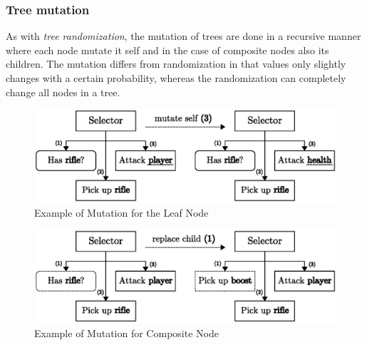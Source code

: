 \documentclass[a4paper, twocolumn]{article}
\begin{document}
        \subsubsection*{Tree mutation}

        As with \textit{tree randomization}, the mutation of trees are done in a recursive manner where each node mutate it self and in the case of composite nodes also its children. The mutation differs from randomization in that values only slightly changes with a certain probability, whereas the randomization can completely change all nodes in a tree.
       
        \begin{figure}[H]
            \centering
            \includegraphics[width=\linewidth]{share/leaf_mutation.eps}
            \caption{Example of Mutation for the Leaf Node}
            \label{fig:leaf_mutation}
        \end{figure}

        \begin{figure}[H]
            \centering
            \includegraphics[width=\linewidth]{share/child_replacement.eps}
            \caption{Example of Mutation for Composite Node}
            \label{fig:child_replacement}
        \end{figure}
\end{document}
